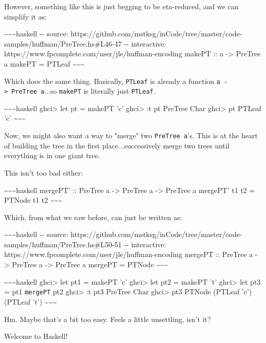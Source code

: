 \documentclass[]{article}
\begin{document}
However, something like this is just begging to be eta-reduced, and we can
simplify it as:

\textasciitilde{}\textasciitilde{}\textasciitilde{}haskell -\/- source:
https://github.com/mstksg/inCode/tree/master/code-samples/huffman/PreTree.hs\#L46-47
-\/- interactive: https://www.fpcomplete.com/user/jle/huffman-encoding makePT ::
a -\textgreater{} PreTree a makePT = PTLeaf
\textasciitilde{}\textasciitilde{}\textasciitilde{}

Which does the same thing. Basically, \texttt{PTLeaf} is already a function
\texttt{a\ -\textgreater{}\ PreTree\ a}...so \texttt{makePT} is literally just
\texttt{PTLeaf}.

\textasciitilde{}\textasciitilde{}\textasciitilde{}haskell ghci\textgreater{}
let pt = makePT 'c' ghci\textgreater{} :t pt PreTree Char ghci\textgreater{} pt
PTLeaf 'c' \textasciitilde{}\textasciitilde{}\textasciitilde{}

Now, we might also want a way to "merge" two \texttt{PreTree\ a}'s. This is at
the heart of building the tree in the first place...successively merge two trees
until everything is in one giant tree.

This isn't too bad either:

\textasciitilde{}\textasciitilde{}\textasciitilde{}haskell mergePT' :: PreTree a
-\textgreater{} PreTree a -\textgreater{} PreTree a mergePT' t1 t2 = PTNode t1
t2 \textasciitilde{}\textasciitilde{}\textasciitilde{}

Which, from what we saw before, can just be written as:

\textasciitilde{}\textasciitilde{}\textasciitilde{}haskell -\/- source:
https://github.com/mstksg/inCode/tree/master/code-samples/huffman/PreTree.hs\#L50-51
-\/- interactive: https://www.fpcomplete.com/user/jle/huffman-encoding mergePT
:: PreTree a -\textgreater{} PreTree a -\textgreater{} PreTree a mergePT =
PTNode \textasciitilde{}\textasciitilde{}\textasciitilde{}

\textasciitilde{}\textasciitilde{}\textasciitilde{}haskell ghci\textgreater{}
let pt1 = makePT 'c' ghci\textgreater{} let pt2 = makePT 't' ghci\textgreater{}
let pt3 = pt1 \texttt{mergePT} pt2 ghci\textgreater{} :t pt3 PreTree Char
ghci\textgreater{} pt3 PTNode (PTLeaf 'c') (PTLeaf 't')
\textasciitilde{}\textasciitilde{}\textasciitilde{}

Hm. Maybe that's a bit too easy. Feels a little unsettling, isn't it?

Welcome to Haskell!
\end{document}
